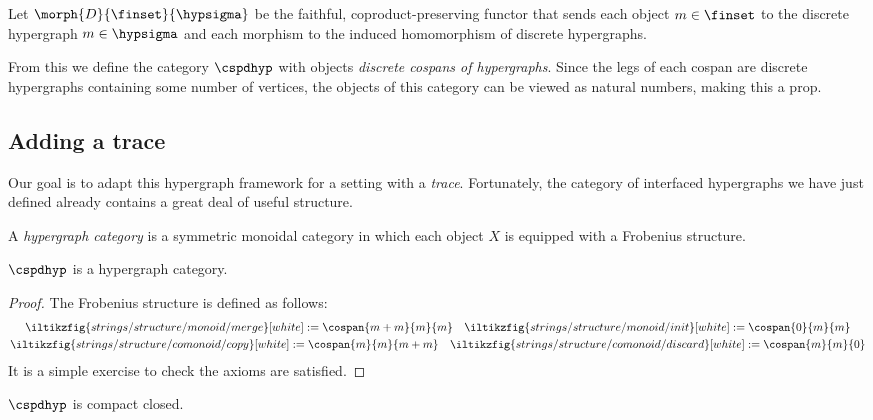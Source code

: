 \begin{definition}
    Let \(\morph{D}{\finset}{\hypsigma}\) be the faithful, coproduct-preserving functor that sends each object \(m \in \finset\) to the discrete hypergraph \(m \in \hypsigma\) and each morphism to the induced homomorphism of discrete hypergraphs.
\end{definition}

\noindent
From this we define the category \(\cspdhyp\) with objects \emph{discrete cospans of hypergraphs}.
Since the legs of each cospan are discrete hypergraphs containing some number of vertices, the objects of this category can be viewed as natural numbers, making this a prop.

\subsection{Adding a trace}

Our goal is to adapt this hypergraph framework for a setting with a \emph{trace}.
Fortunately, the category of interfaced hypergraphs we have just defined already contains a great deal of useful structure.

\begin{definition}
    A \emph{hypergraph category} is a symmetric monoidal category in which each object \(X\) is equipped with a Frobenius structure.
\end{definition}

\begin{proposition}
    \(\cspdhyp\) is a hypergraph category.
\end{proposition}
\begin{proof}
    The Frobenius structure is defined as follows:
    \begin{gather*}
        \iltikzfig{strings/structure/monoid/merge}[white]
        :=
        \cospan{m + m}{m}{m}
        \quad
        \iltikzfig{strings/structure/monoid/init}[white]
        :=
        \cospan{0}{m}{m}
        \\
        \iltikzfig{strings/structure/comonoid/copy}[white]
        :=
        \cospan{m}{m}{m+m}
        \quad
        \iltikzfig{strings/structure/comonoid/discard}[white]
        :=
        \cospan{m}{m}{0}
    \end{gather*}
    It is a simple exercise to check the axioms are satisfied.
\end{proof}

\begin{corollary}
    \(\cspdhyp\) is compact closed.
\end{corollary}

